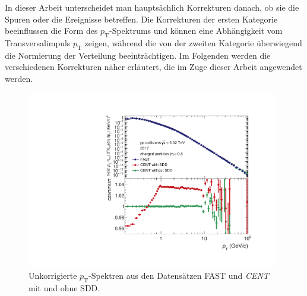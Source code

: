 \documentclass[12pt,a4paper]{report}
\begin{document}
In dieser Arbeit unterscheidet man hauptsächlich Korrekturen danach, ob sie die Spuren oder die Ereignisse betreffen. Die Korrekturen der ersten Kategorie beeinflussen die Form des $p_{\mathrm{T}}$-Spektrums und können eine Abhängigkeit vom Transversalimpuls $p_{\mathrm{T}}$ zeigen, während die von der zweiten Kategorie überwiegend die Normierung der Verteilung beeinträchtigen. Im Folgenden werden die verschiedenen Korrekturen näher erläutert, die im Zuge dieser Arbeit angewendet werden.
\begin{figure}[tb!]
\centering
\includegraphics[width=11cm]{Plots/uncorrectedSpectra.pdf} 
\caption{Unkorrigierte $p_{\mathrm{T}}$-Spektren aus den Datensätzen \textsc{FAST} und \textit{CENT} mit und ohne SDD.}
\label{RawSpectra}
\end{figure}
\vspace{-0.5cm}
\end{document}
